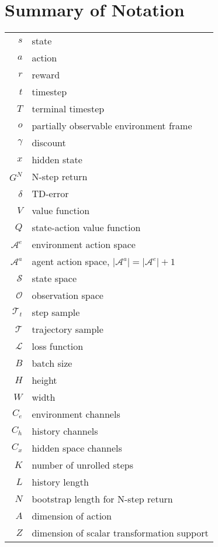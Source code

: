 \section{Summary of Notation}

\begin{tabular}{| r | l |}
    \hline
    $s$ & state  \\
    $a$ & action \\
    $r$ & reward \\
    $t$ & timestep \\
    $T$ & terminal timestep \\
    $o$ & partially observable environment frame \\
    $\gamma$ & discount \\
    $x$ & hidden state \\
    $G^N$ & N-step return \\
    $\delta$ & TD-error \\
    $V$ & value function \\
    $Q$ & state-action value function \\
    $\mathcal{A}^e$ & environment action space \\
    $\mathcal{A}^a$ & agent action space, $ | \mathcal{A}^a | = | \mathcal{A}^e | + 1$ \\
    $\mathcal{S}$ & state space \\
    $\mathcal{O}$ & observation space \\
    $\mathcal{T}_t$ & step sample \\
    $\mathcal{T}$ & trajectory sample \\
    $\mathcal{L}$ & loss function \\

    \hline
    $B$ & batch size\\
    $H$ & height \\
    $W$ & width \\
    $C_e$ & environment channels \\
    $C_h$ & history channels \\
    $C_x$ & hidden space channels \\
    $K$ & number of unrolled steps \\
    $L$ & history length \\
    $N$ & bootstrap length for N-step return \\
    $A$ & dimension of action \\
    $Z$ & dimension of scalar transformation support \\
    \hline


\end{tabular}
